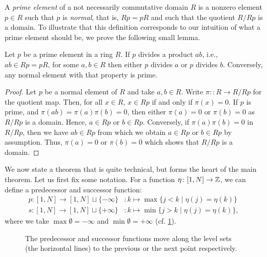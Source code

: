 \medskip

A \emph{prime element} of a not necessarily commutative domain $R$
is a nonzero element $p \in R$ such that $p$ is \emph{normal},
that is, $Rp = pR$ and such that the quotient $R / Rp$ is a domain. To illustrate that
this definition corresponds to our intuition of what a prime element should be, we
prove the following small lemma.
\begin{lemma}\label{lem:prime_divides_product}
	Let $p$ be a prime element in a ring $R$. If $p$ divides a product $ab$, i.e., $ab \in
		Rp = pR$, for some $a,b \in R$ then either $p$ divides $a$ or $p$ divides $b$.
	Conversely, any normal element with that property is prime.
\end{lemma}
\begin{proof}
	Let $p$ be a normal element of $R$ and take $a,b \in R$. Write $\pi : \colon R \to R /
		Rp$ for the quotient map. Then, for all $x \in R$, $x \in Rp$ if and only if $\pi(x) =
		0$. If $p$ is prime, and $\pi(ab) = \pi(a)\pi(b) = 0$, then either $\pi(a) = 0$ or
	$\pi(b) = 0$ as $R/Rp$ is a domain. Hence, $a \in Rp$ or $b \in Rp$. Conversely, if
	$\pi(a)\pi(b) = 0$ in $R/Rp$, then we have $ab \in Rp$ from which we obtain $a \in Rp$
	or $b \in Rp$ by assumption. Thus, $\pi(a) = 0$ or $\pi(b) = 0$ which shows that $R/
		Rp$ is a domain.
\end{proof}
%
We now state a theorem that is quite technical, but forms the heart of the main
theorem. Let us first fix some notation. For a function $\eta \colon [1, N] \to \mathbb{Z}$,
we can define a predecessor and successor
function:
\begin{align*}
	p \colon [1, N] \to [1, N] \sqcup \{-\infty\} & \colon k \mapsto  \max\{j < k \mid \eta(j) = \eta(k)\}  \\
	s \colon [1, N] \to [1, N] \sqcup \{+\infty\} & \colon k \mapsto  \min\{j > k \mid \eta(j) = \eta(k)\},
\end{align*}
%
where we take $\max \emptyset = - \infty$ and $\min \emptyset = + \infty$ (cf.
\cref{fig:predecessor_successor}).

\begin{figure}[h]
	\centering
	\caption{The predecessor and successor functions move along the level sets (the horizontal lines) to the previous or the next point respectively.}
	\label{fig:predecessor_successor}
\end{figure}

